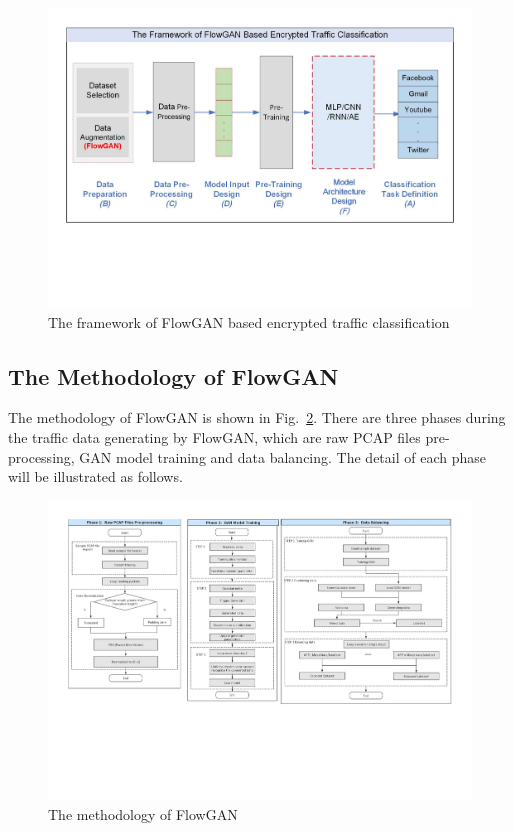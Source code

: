 \documentclass[letterpaper,12pt]{article}
\begin{document}
\begin{figure}[!t]
	\centering
	\includegraphics[width=6 in]{figures/Fig_2_flowgan_framework}
	\caption{The framework of FlowGAN based encrypted traffic classification}
	\label{fig:framework_gan}
\end{figure}


\subsection{The Methodology of FlowGAN}
The methodology of FlowGAN is shown in Fig.~\ref{fig:methodology_gan}. There are three phases during the traffic data generating by FlowGAN, which are raw PCAP files pre-processing, GAN model training and data balancing. The detail of each phase will be illustrated as follows.

\begin{figure}[!t]
	\centering
	\includegraphics[width=6 in]{figures/Fig_3_flowgan_methodology}
	\caption{The methodology of FlowGAN}
	\label{fig:methodology_gan}
\end{figure}
\end{document}
